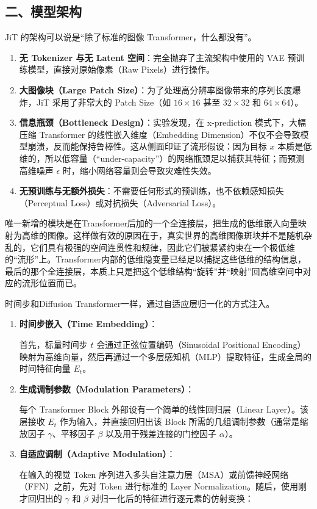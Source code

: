\hypertarget{ux4e8cux6a21ux578bux67b6ux6784-2}{%
\subsection{二、模型架构}\label{ux4e8cux6a21ux578bux67b6ux6784-2}}

JiT 的架构可以说是``除了标准的图像 Transformer，什么都没有''。

\begin{enumerate}
\def\labelenumi{\arabic{enumi}.}
\tightlist
\item
  \textbf{无 Tokenizer 与无 Latent 空间}：完全抛弃了主流架构中使用的 VAE 预训练模型，直接对原始像素（Raw Pixels）进行操作。
\item
  \textbf{大图像块（Large Patch Size）}：为了处理高分辨率图像带来的序列长度爆炸，JiT 采用了非常大的 Patch Size（如 \(16\times16\) 甚至 \(32\times32\) 和 \(64\times64\)）。
\item
  \textbf{信息瓶颈（Bottleneck Design）}：实验发现，在 x-prediction 模式下，大幅压缩 Transformer 的线性嵌入维度（Embedding Dimension）不仅不会导致模型崩溃，反而能保持鲁棒性。这从侧面印证了流形假设：因为目标 \(x\) 本质是低维的，所以低容量（``under-capacity''）的网络瓶颈足以捕获其特征；而预测高维噪声 \(\epsilon\) 时，缩小网络容量则会导致灾难性失效。
\item
  \textbf{无预训练与无额外损失}：不需要任何形式的预训练，也不依赖感知损失（Perceptual Loss）或对抗损失（Adversarial Loss）。
\end{enumerate}

唯一新增的模块是在Transformer后加的一个全连接层，把生成的低维嵌入向量映射为高维的图像。这样做有效的原因在于，真实世界的高维图像斑块并不是随机杂乱的，它们具有极强的空间连贯性和规律，因此它们被紧紧约束在一个极低维的``流形''上。Transformer内部的低维隐变量已经足以捕捉这些低维的结构信息，最后的那个全连接层，本质上只是把这个低维结构``旋转''并``映射''回高维空间中对应的流形位置而已。

时间步和Diffusion Transformer一样，通过自适应层归一化的方式注入。

\begin{enumerate}
\def\labelenumi{\arabic{enumi}.}
\item
  \textbf{时间步嵌入（Time Embedding）}：

  首先，标量时间步 \(t\) 会通过正弦位置编码（Sinusoidal Positional Encoding）映射为高维向量，然后再通过一个多层感知机（MLP）提取特征，生成全局的时间特征向量 \(E_t\)。
\item
  \textbf{生成调制参数（Modulation Parameters）}：

  每个 Transformer Block 外部设有一个简单的线性回归层（Linear Layer）。该层接收 \(E_t\) 作为输入，并直接回归出该 Block 所需的几组调制参数（通常是缩放因子 \(\gamma\)、平移因子 \(\beta\) 以及用于残差连接的门控因子 \(\alpha\)）。
\item
  \textbf{自适应调制（Adaptive Modulation）}：

  在输入的视觉 Token 序列进入多头自注意力层（MSA）或前馈神经网络（FFN）之前，先对 Token 进行标准的 Layer Normalization。随后，使用刚才回归出的 \(\gamma\) 和 \(\beta\) 对归一化后的特征进行逐元素的仿射变换：
\end{enumerate}

